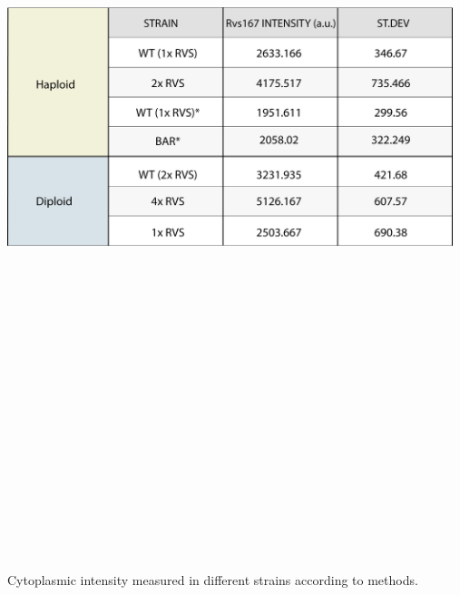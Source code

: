 \newpage
\begin{table}[H]
	\centering
	\includegraphics[width=13cm,height=25cm,keepaspectratio]{figures/results_final/table2}
	\caption[Cytoplasmic intensity quantification]
	{ Cytoplasmic intensity measured in different strains according to methods.
		\label{table2}}

\end{table}